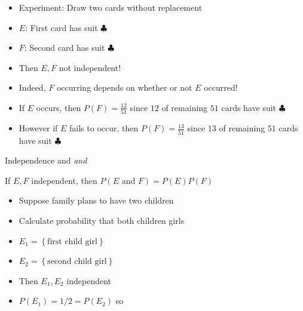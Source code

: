 \documentclass[handout]{beamer}
\theoremstyle{definition}
\begin{document}
\begin{frame}
\begin{example}
\begin{itemize}
\item Experiment: Draw two cards without replacement
\item $E$: First card has suit $\clubsuit$
\item $F$: Second card has suit $\clubsuit$
\item Then $E,F$ \alert{not} independent!
\item Indeed, $F$ occurring depends on whether or not
$E$ occurred!
\item If $E$ occurs, then $P\left(F\right)=\frac{12}{51}$
since $12$ of remaining $51$ cards have suit $\clubsuit$
\item However if $E$ fails to occur, then $P\left(F\right)=\frac{13}{51}$
since $13$ of remaining $51$ cards have suit $\clubsuit$
\end{itemize}
\end{example}
\end{frame}

\begin{frame}{Independence and \em{and}}
\begin{theorem}
If $E,F$ independent, then
$P\left(\text{$E$ and $F$}\right)=P\left(E\right)P\left(F\right)$
\end{theorem}
\begin{example}
\begin{itemize}
\item Suppose family plans to have two children
\item Calculate probability that both children girls
\item $E_1=\left\{\text{first child girl}\right\}$
\item $E_2=\left\{\text{second child girl}\right\}$
\item Then $E_1,E_2$ independent
\item $P\left(E_1\right)=1/2=P\left(E_2\right)$ so
\end{itemize}
\end{example}
\end{frame}
\end{document}
